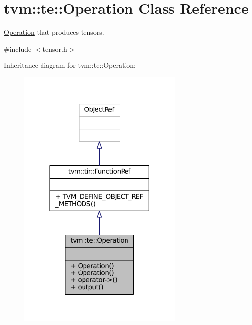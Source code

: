 \hypertarget{classtvm_1_1te_1_1Operation}{}\section{tvm\+:\+:te\+:\+:Operation Class Reference}
\label{classtvm_1_1te_1_1Operation}


\hyperlink{classtvm_1_1te_1_1Operation}{Operation} that produces tensors.  




{\ttfamily \#include $<$tensor.\+h$>$}



Inheritance diagram for tvm\+:\+:te\+:\+:Operation\+:
\nopagebreak
\begin{figure}[H]
\begin{center}
\leavevmode
\includegraphics[width=230pt]{classtvm_1_1te_1_1Operation__inherit__graph}
\end{center}
\end{figure}


